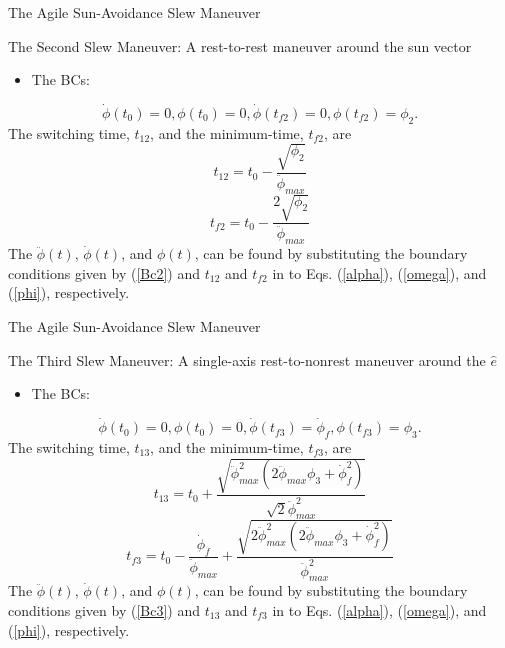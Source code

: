 \documentclass{beamer}
\begin{document}
\begin{frame}{The Agile Sun-Avoidance Slew Maneuver}
\begin{block}{The Second Slew Maneuver: A rest-to-rest maneuver around the sun vector}
\begin{itemize}
\item The BCs: 
\end{itemize}
\begin{equation}\label{Bc2}
\dot{\phi}(t_0)=0,\phi(t_0)=0, \dot{\phi}(t_{f2})=0,\phi(t_{f2})=\phi_2.
\end{equation}
 The switching time, $t_{12}$, and the minimum-time, $t_{f2}$, are
\begin{equation}\label{t21}
t_{12}=t_0-\frac{\sqrt{\phi_2}}{\ddot{\phi}_{max}}
\end{equation}
\begin{equation}\label{tf2}
t_{f2}=t_0-\frac{2\sqrt{\phi_2}}{\ddot{\phi}_{max}}
\end{equation}
The $\ddot{\phi}(t)$, $\dot{\phi}(t)$, and  $\phi(t)$,  can be found by substituting the boundary conditions given by (\ref{Bc2}) and $t_{12}$ and $t_{f2}$ in to Eqs. (\ref{alpha}), (\ref{omega}), and (\ref{phi}), respectively.
\end{block}
\end{frame}

\begin{frame}{The Agile Sun-Avoidance Slew Maneuver}
\begin{block}{The Third Slew Maneuver: A single-axis rest-to-nonrest maneuver around the $\hat{e}$}
\begin{itemize}
 \item The BCs: 
\end{itemize}
\begin{equation}\label{Bc3}
\dot{\phi}(t_0)=0,\phi(t_0)=0, \dot{\phi}(t_{f3})=\dot{\phi}_{f},\phi(t_{f3})=\phi_3.
\end{equation}
 The switching time, $t_{13}$, and the minimum-time, $t_{f3}$, are
\begin{equation}\label{t31}
t_{13}=t_0+\frac{\sqrt{\ddot{\phi}_{max}^2(2\ddot{\phi}_{max}\phi_3+\dot{\phi}_{f}^2)}}{\sqrt{2}\ddot{\phi}_{max}^2}
\end{equation}
\begin{equation}\label{tf3}
t_{f3}=t_0-\frac{\dot{\phi}_{f}}{\ddot{\phi}_{max}}+\frac{\sqrt{2\ddot{\phi}_{max}^2(2\ddot{\phi}_{max}\phi_3+\dot{\phi}_{f}^2)}}{\ddot{\phi}_{max}^2}
\end{equation}
The $\ddot{\phi}(t)$, $\dot{\phi}(t)$, and  $\phi(t)$,  can be found by substituting the boundary conditions given by (\ref{Bc3}) and $t_{13}$ and $t_{f3}$ in to Eqs. (\ref{alpha}), (\ref{omega}), and (\ref{phi}), respectively.
\end{block}
\end{frame}
\end{document}
